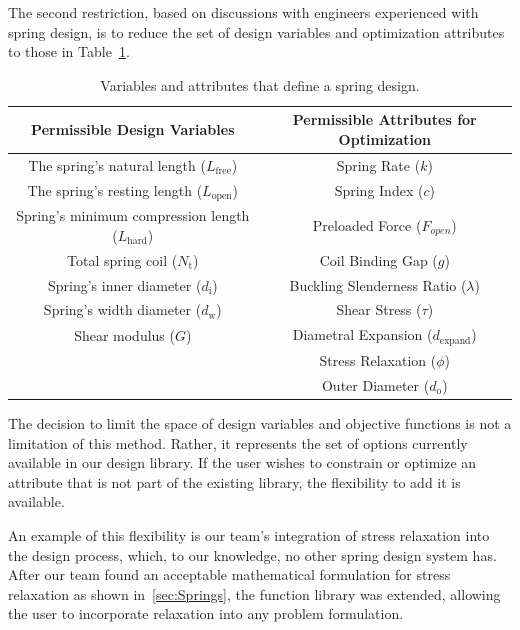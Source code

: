 \documentclass[10pt]{article}
\begin{document}
The second restriction, based on discussions with engineers experienced with spring design, is to reduce the set of design variables and optimization attributes to those in Table~\ref{tab:Design}.
\begin{table}
\caption{Variables and attributes that define a spring design.}
	\centering
	 \begin{tabular}{ c  c }
	 \hline\hline
	 Permissible Design Variables & Permissible Attributes for Optimization \\
	 \hline
     	The spring's natural length ($L_{\text{free}}$) 					& Spring Rate ($k$) \\
	    The spring's resting length ($L_{\text{open}}$) 				& Spring Index ($c$)  \\
		Spring's minimum compression length  ($L_{\text{hard}}$) 	& Preloaded Force ($F_{open}$) \\
		Total spring coil ($N_{\text{t}}$)    						& Coil Binding Gap ($g$) \\
		Spring's inner diameter ($d_{\text{i}}$)    					& Buckling Slenderness Ratio ($\lambda$) \\
		Spring's width diameter ($d_{\text{w}}$)    					& Shear Stress ($\tau$) \\
		Shear modulus  ($G$)        							& Diametral Expansion ($d_{\text{expand}}$) \\
														& Stress Relaxation ($\phi$) \\
														& Outer Diameter ($d_{\text{o}}$) \\
\hline\hline
	 \end{tabular}
	 \label{tab:Design}
\end{table}
The decision to limit the space of design variables and objective functions is not a limitation of this method.  Rather, it represents the set of options currently available in our design library.  If the user wishes to constrain or optimize an attribute that is not part of the existing library, the flexibility to add it is available.

An example of this flexibility is our team's integration of stress relaxation into the design process, which, to our knowledge, no other spring design system has. After our team found an acceptable mathematical formulation for stress relaxation as shown in~\ref{sec:Springs}, the function library was extended, allowing the user to incorporate relaxation into any problem formulation.
\end{document}
